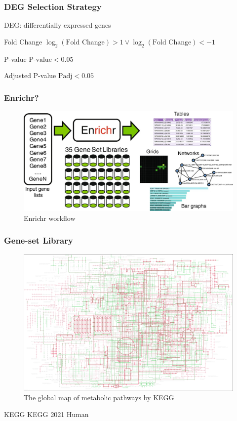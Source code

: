 \documentclass{beamer}
\begin{document}
    \begin{frame}
        \frametitle{DEG Selection Strategy}
        DEG: differentially expressed genes

        \begin{block}{Fold Change}
            $\log_{2}(\text{Fold Change}) > 1 \vee \log_{2}(\text{Fold Change}) < -1$
        \end{block}

        \begin{block}{P-value}
            $\text{P-value} < 0.05$
        \end{block}

        \begin{block}{Adjusted P-value}
            $\text{Padj} < 0.05$
        \end{block}
    \end{frame}

    \begin{frame}
        \frametitle{Enrichr?}

        \begin{figure}
            \includegraphics[width=0.8 \linewidth]{figures/Workflow/Enrichr.jpg}
            \caption{Enrichr workflow \protect\cite{Enrichr1, Enrichr2}}
        \end{figure}
    \end{frame}

    \begin{frame}
        \frametitle{Gene-set Library}

        \begin{figure}
            \includegraphics[width=0.6 \linewidth]{figures/Workflow/KEGG.jpg}
            \caption{The global map of metabolic pathways by KEGG \protect\cite{KEGG1}}
        \end{figure}

        \begin{block}{KEGG}
            KEGG 2021 Human
        \end{block}
    \end{frame}
\end{document}
